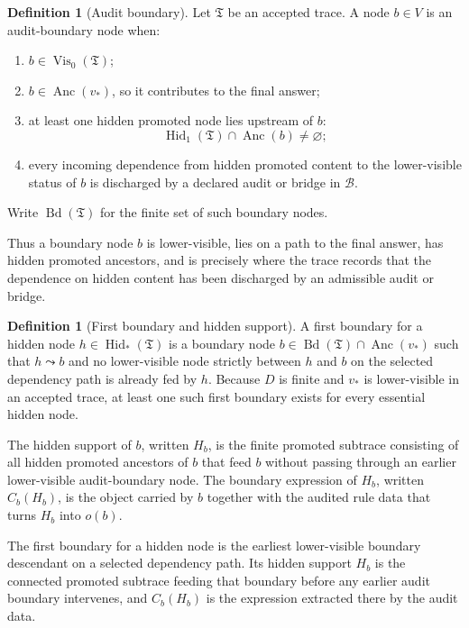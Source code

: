 \documentclass[11pt]{article}
\newcommand{\Anc}{\operatorname{Anc}}
\newcommand{\Hid}{\operatorname{Hid}}
\newcommand{\Vis}{\operatorname{Vis}}
\newcommand{\Bd}{\operatorname{Bd}}
\theoremstyle{definition}
\newtheorem{definition}[theorem]{Definition}
\begin{document}
\begin{definition}[Audit boundary]
\label{def:sau-audit-boundary}
Let \(\mathfrak T\) be an accepted trace.  A node \(b\in V\) is an audit-boundary node when:
\begin{enumerate}
\item \(b\in \Vis_0(\mathfrak T)\);
\item \(b\in\Anc(v_\ast)\), so it contributes to the final answer;
\item at least one hidden promoted node lies upstream of \(b\):
\[
\Hid_1(\mathfrak T)\cap \Anc(b)\neq\varnothing;
\]
\item every incoming dependence from hidden promoted content to the lower-visible status of \(b\) is discharged by a declared audit or bridge in \(\mathcal B\).
\end{enumerate}
Write \(\Bd(\mathfrak T)\) for the finite set of such boundary nodes.
\end{definition}

Thus a boundary node \(b\) is lower-visible, lies on a path to the final answer,
has hidden promoted ancestors, and is precisely where the trace records that
the dependence on hidden content has been discharged by an admissible audit or
bridge.

\begin{definition}[First boundary and hidden support]
\label{def:sau-first-boundary-support}
A first boundary for a hidden node \(h\in\Hid_\ast(\mathfrak T)\) is a boundary node \(b\in\Bd(\mathfrak T)\cap\Anc(v_\ast)\) such that \(h\leadsto b\) and no lower-visible node strictly between \(h\) and \(b\) on the selected dependency path is already fed by \(h\).  Because \(D\) is finite and \(v_\ast\) is lower-visible in an accepted trace, at least one such first boundary exists for every essential hidden node.

The hidden support of \(b\), written \(H_b\), is the finite promoted subtrace consisting of all hidden promoted ancestors of \(b\) that feed \(b\) without passing through an earlier lower-visible audit-boundary node.  The boundary expression of \(H_b\), written \(C_b(H_b)\), is the object carried by \(b\) together with the audited rule data that turns \(H_b\) into \(o(b)\).
\end{definition}

The first boundary for a hidden node is the earliest lower-visible boundary
descendant on a selected dependency path.  Its hidden support \(H_b\) is the
connected promoted subtrace feeding that boundary before any earlier audit
boundary intervenes, and \(C_b(H_b)\) is the expression extracted there by the
audit data.
\end{document}
